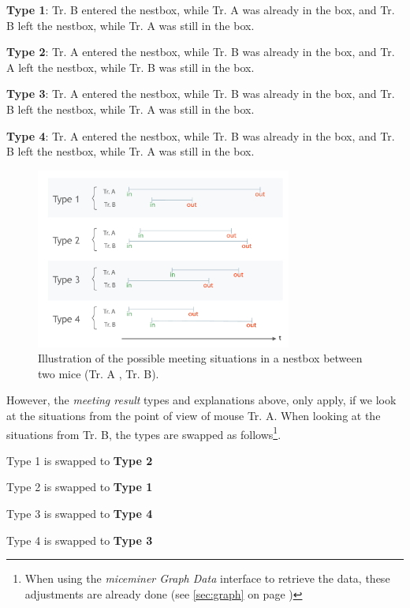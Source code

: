 \begin{mydesc}
\label{list:meeting_types}
\item \textbf{Type 1}: Tr. B entered the nestbox, while Tr. A was already in the box, and Tr. B left the nestbox, while Tr. A was still in the box. 
\item \textbf{Type 2}: Tr. A entered the nestbox, while Tr. B was already in the box, and Tr. A left the nestbox, while Tr. B was still in the box. 
\item \textbf{Type 3}: Tr. A entered the nestbox, while Tr. B was already in the box, and Tr. B left the nestbox, while Tr. A was still in the box. 
\item \textbf{Type 4}: Tr. A entered the nestbox, while Tr. B was already in the box, and Tr. B left the nestbox, while Tr. A was still in the box. 
\end{mydesc}

\begin{figure}[htpb]
\begin{center}
  \includegraphics[width=0.75\textwidth]{assets/pdf/meeting_types_schema.pdf}
  \caption[Meeting results types illustration]{Illustration of the possible meeting situations in a nestbox between two mice (Tr. A , Tr. B).}
  \label{fig:meeting_types}
\end{center}
\end{figure}

However, the \textit{meeting result} types and explanations above, only apply, if we look at the situations from the point of view of mouse Tr. A. When looking at the situations from Tr. B, the types are swapped as follows\footnote{When using the \textit{miceminer Graph Data} interface to retrieve the data, these adjustments are already done (see \ref{sec:graph} on page \pageref{sec:graph})}.

\begin{mylist}
\item Type 1 is swapped to \textbf{Type 2}   
\item Type 2 is swapped to \textbf{Type 1}
\item Type 3 is swapped to \textbf{Type 4} 
\item Type 4 is swapped to \textbf{Type 3}
\end{mylist}

